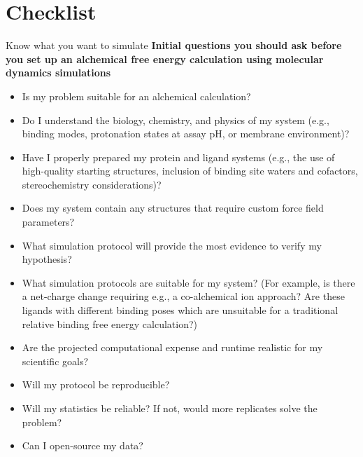 \documentclass[9pt,bestpractices]{livecoms}
\begin{document}
\section{Checklist}
\label{sec:checklist}
\begin{Checklists*}
\begin{checklist}{ Know what you want to simulate}
    \textbf{Initial questions you should ask before you set up an alchemical free energy calculation using molecular dynamics simulations}
\begin{itemize}
    \item Is my problem suitable for an alchemical calculation?
    \item Do I understand the biology, chemistry, and physics of my system (e.g., binding modes, protonation states at assay pH, or membrane environment)?
    \item Have I properly prepared my protein and ligand systems (e.g., the use of high-quality starting structures, inclusion of binding site waters and cofactors, stereochemistry considerations)?
    \item Does my system contain any structures that require custom force field parameters?
    \item What simulation protocol will provide the most evidence to verify my hypothesis?
    \item What simulation protocols are suitable for my system? (For example, is there a net-charge change requiring e.g., a co-alchemical ion approach? Are these ligands with different binding poses which are unsuitable for a traditional relative binding free energy calculation?)
    \item Are the projected computational expense and runtime realistic for my scientific goals?
    \item Will my protocol be reproducible? 
    \item Will my statistics be reliable? If not, would more replicates solve the problem? 
    \item Can I open-source my data?
\end{itemize}
\end{checklist}


\end{Checklists*}
\end{document}
